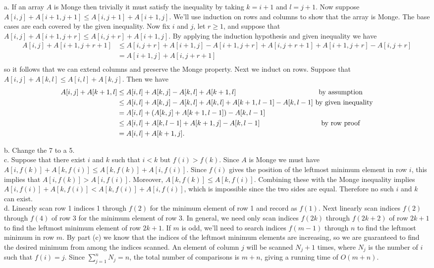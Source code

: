 \documentclass{article}
\begin{document}
a. If an array $A$ is Monge then trivially it must satisfy the inequality by taking $k = i+1$ and $l = j+1$.  Now suppose $A[i,j] + A[i+1,j+1] \leq A[i,j+1] + A[i+1,j]$.  We'll use induction on rows and columns to show that the array is Monge.  The base cases are each covered by the given inequality.  Now fix $i$ and $j$, let $r \geq 1$, and suppose that $A[i,j] + A[i+1,j+r] \leq A[i,j+r] + A[i+1,j]$.  By applying the induction hypothesis and given inequality we have
\begin{align*}
A[i,j] + A[i+1,j+r+1] &\leq  A[i,j+r] + A[i+1,j] -  A[i+1,j+r] + A[i, j+r+1] + A[i+1, j+r] - A[i, j+r] \\
&=  A[i+1,j] + A[i, j+r+1]  \\
\end{align*}
so it follows that we can extend columns and preserve the Monge property.  Next we induct on rows.  Suppose that $A[i,j] + A[k,l] \leq A[i,l] + A[k,j]$.  Then we have
\begin{align*}
A[i,j] + A[k+1,l] &\leq A[i,l] + A[k,j] - A[k,l] +  A[k+1,l] \hspace{4.2cm} \mbox{by assumption} \\
&\leq  A[i,l] + A[k,j] - A[k,l] + A[k,l] + A[k+1,l-1] - A[k,l-1] \mbox{ by given inequality} \\
&=  A[i,l] + (A[k,j] + A[k+1,l-1]) - A[k,l-1] \\
&\leq A[i,l] + A[k,l-1] + A[k+1,j] - A[k,l-1] \hspace{3cm} \mbox{ by row proof} \\
&= A[i,l] + A[k+1,j].
\end{align*}

b. Change the 7 to a 5. \\

c. Suppose that there exist $i$ and $k$ such that $i < k$ but $f(i) > f(k)$.  Since $A$ is Monge we must have $A[i,f(k)] + A[k,f(i)] \leq A[k,f(k)] + A[i,f(i)]$. Since $f(i)$ gives the position of the leftmost minimum element in row $i$, this implies that $A[i,f(k)] > A[i,f(i)]$.  Moreover, $A[k, f(k)] \leq A[k,f(i)]$.  Combining these with the Monge inequality implies $A[i,f(i)] + A[k,f(i)] < A[k,f(i)] + A[i,f(i)]$, which is impossible since the two sides are equal.  Therefore no such $i$ and $k$ can exist. \\

d.  Linearly scan row 1 indices 1 through $f(2)$ for the minimum element of row 1 and record as $f(1)$.  Next linearly scan indices $f(2)$ through $f(4)$ of row 3 for the minimum element of row 3.  In general, we need only scan indices $f(2k)$ through $f(2k+2)$ of row $2k+1$ to find the leftmost minimum element of row $2k+1$.  If $m$ is odd, we'll need to search indices $f(m-1)$ through $n$ to find the leftmost minimum in row $m$.  By part (c) we know that the indices of the leftmost minimum elements are increasing, so we are guaranteed to find the desired minimum from among the indices scanned. An element of column $j$ will be scanned $N_j + 1$ times, where $N_j$ is the number of $i$ such that $f(i) = j$. Since $\sum_{j=1}^n N_j= n$, the total number of comparisons is $m + n$, giving a running time of $O(m+n)$. \\
\end{document}
